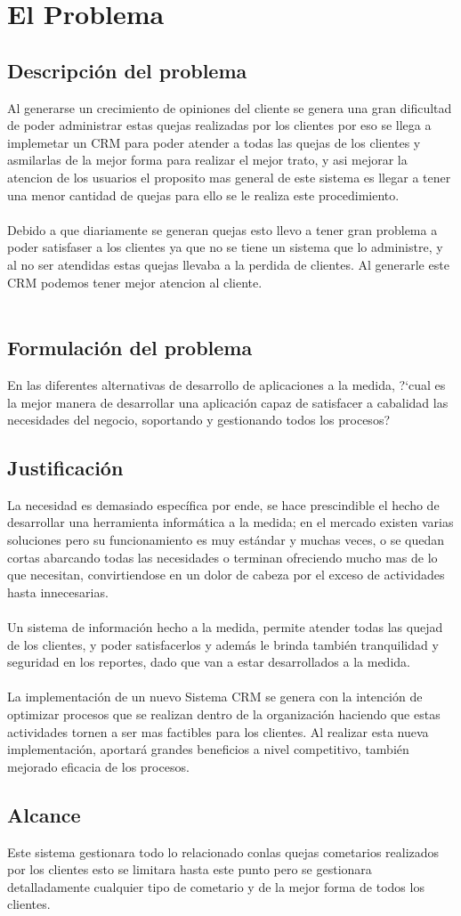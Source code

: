 \chapter{El Problema}\label{Problema}
\section{Descripci\'on del problema}
Al generarse un crecimiento de opiniones del cliente se genera una gran dificultad de poder administrar estas quejas realizadas por los clientes por eso se llega a implemetar un CRM para poder atender a todas las quejas de los clientes y asmilarlas de la mejor forma para realizar el mejor trato, y asi mejorar la atencion de los usuarios el proposito mas general de este sistema es llegar a tener una menor cantidad de quejas para ello se le realiza este procedimiento.
%
\\%
\\%
Debido a que diariamente se generan quejas esto llevo a tener gran problema a poder satisfaser a los clientes ya que no se tiene un sistema que lo administre, y al no ser atendidas estas quejas llevaba a la perdida de clientes. Al generarle este CRM podemos tener mejor atencion al cliente.%
\\%
\\%
%
\section{Formulaci\'on del problema}
En las diferentes alternativas de desarrollo de aplicaciones a la medida, ?`cual es la mejor manera de desarrollar una aplicaci\'on capaz de satisfacer a cabalidad las necesidades del negocio, soportando y gestionando todos los procesos?%
%
\section{Justificaci\'on}
La necesidad es demasiado espec\'ifica por ende, se hace prescindible el hecho de desarrollar una herramienta inform\'atica a la medida; en el mercado existen varias soluciones pero su funcionamiento es muy est\'andar y muchas veces, o se quedan cortas abarcando todas las necesidades o terminan ofreciendo mucho mas de lo que necesitan, convirtiendose en un dolor de cabeza por el exceso de actividades hasta innecesarias.%
\\%
\\%
Un sistema de informaci\'on hecho a la medida, permite atender todas las quejad de los  clientes, y poder satisfacerlos y adem\'as le brinda tambi\'en tranquilidad y seguridad en los reportes, dado que van a estar desarrollados a la medida.%
\\%
\\%
La implementaci\'on de un nuevo Sistema CRM se genera con la intenci\'on de optimizar procesos que se realizan dentro de la organizaci\'on haciendo que estas actividades tornen a ser mas factibles para los clientes. Al realizar esta nueva implementaci\'on, aportar\'a grandes beneficios a nivel competitivo, tambi\'en mejorado eficacia de los procesos.
%
\section{Alcance}
Este sistema gestionara todo lo relacionado conlas quejas cometarios realizados por los clientes esto se limitara hasta este punto pero se gestionara detalladamente cualquier tipo de cometario y de la mejor forma de todos los clientes.%